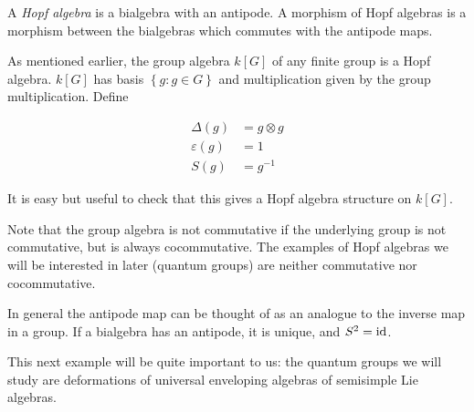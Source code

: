 \begin{defn}
    A \emph{Hopf algebra} is a bialgebra with an antipode. A morphism of Hopf
    algebras is a morphism between the bialgebras which commutes with the
    antipode maps. 
\end{defn}

\begin{example}
    \label{example:groupalgebra}
    As mentioned earlier, the group algebra $k[G]$ of any finite group is a
    Hopf algebra. $k[G]$ has basis $\left\{ g: g \in G \right\}$ and
    multiplication given by the group multiplication. Define

\begin{align}
\Delta(g) &= g \otimes g \\
\varepsilon(g) &= 1 \\
S(g) &= g^{-1}
\end{align}

    It is easy but useful to check that this gives a Hopf algebra structure on $k[G]$.

    Note that the group algebra is not commutative if the underlying group is
    not commutative, but is always cocommutative. The examples of Hopf algebras
    we will be interested in later (quantum groups) are neither commutative nor
    cocommutative. 
\end{example}

In general the antipode map can be thought of as an analogue to the inverse map
in a group. If a bialgebra has an antipode, it is unique, and $S^2 = \operatorname{id}$.

This next example will be quite important to us: the quantum groups we will
study are deformations of universal enveloping algebras of semisimple Lie
algebras.

